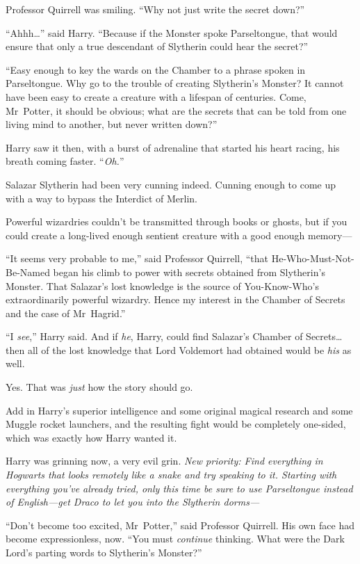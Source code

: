 Professor Quirrell was smiling.
“Why not just write the secret down?”

“Ahhh…” said Harry.
“Because if the Monster spoke Parseltongue, that would ensure that only a true descendant of Slytherin could hear the secret?”

“Easy enough to key the wards on the Chamber to a phrase spoken in Parseltongue. Why go to the trouble of creating Slytherin’s Monster? It cannot have been easy to create a creature with a lifespan of centuries. Come, Mr~Potter, it should be obvious; what are the secrets that can be told from one living mind to another, but never written down?”

Harry saw it then, with a burst of adrenaline that started his heart racing, his breath coming faster. “\emph{Oh.}”

Salazar Slytherin had been very cunning indeed. Cunning enough to come up with a way to bypass the Interdict of Merlin.

Powerful wizardries couldn’t be transmitted through books or ghosts, but if you could create a long-lived enough sentient creature with a good enough memory—

“It seems very probable to me,” said Professor Quirrell, “that He-Who-Must-Not-Be-Named began his climb to power with secrets obtained from Slytherin’s Monster. That Salazar’s lost knowledge is the source of You-Know-Who’s extraordinarily powerful wizardry. Hence my interest in the Chamber of Secrets and the case of Mr~Hagrid.”

“I \emph{see},” Harry said. And if \emph{he}, Harry, could find Salazar’s Chamber of Secrets…then all of the lost knowledge that Lord Voldemort had obtained would be \emph{his} as well.

Yes. That was \emph{just} how the story should go.

Add in Harry’s superior intelligence and some original magical research and some Muggle rocket launchers, and the resulting fight would be completely one-sided, which was exactly how Harry wanted it.

Harry was grinning now, a very evil grin. \emph{New priority: Find everything in Hogwarts that looks remotely like a snake and try speaking to it. Starting with everything you’ve already tried, only this time be sure to use Parseltongue instead of English—get Draco to let you into the Slytherin dorms—}

“Don’t become too excited, Mr~Potter,” said Professor Quirrell. His own face had become expressionless, now.
“You must \emph{continue} thinking. What were the Dark Lord’s parting words to Slytherin’s Monster?”


